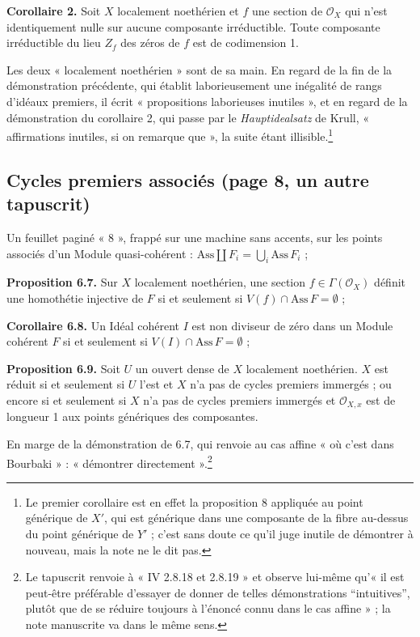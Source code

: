\documentclass[11pt,a4paper]{article}
\begin{document}
\textbf{Corollaire 2.} Soit $X$ localement noethérien et $f$ une section de
$\mathcal{O}_{X}$ qui n'est identiquement nulle sur aucune composante
irréductible. Toute composante irréductible du lieu $Z_{f}$ des zéros de $f$
est de codimension 1.

Les deux « localement noethérien » sont de sa main. En regard de la fin de la
démonstration précédente, qui établit laborieusement une inégalité de rangs
d'idéaux premiers, il écrit « propositions laborieuses inutiles », et en
regard de la démonstration du corollaire 2, qui passe par le
\emph{Hauptidealsatz} de Krull, « affirmations inutiles, si on remarque que »,
la suite étant illisible.\footnote{Le premier corollaire est en effet la
proposition 8 appliquée au point générique de $X'$, qui est générique dans une
composante de la fibre au-dessus du point générique de $Y'$ ; c'est sans doute
ce qu'il juge inutile de démontrer à nouveau, mais la note ne le dit pas.}

\subsection*{Cycles premiers associés (page 8, un autre tapuscrit)}

Un feuillet paginé « 8 », frappé sur une machine sans accents, sur les points
associés d'un Module quasi-cohérent : $\mathrm{Ass} \coprod F_{i} = \bigcup_{i}
\mathrm{Ass}\, F_{i}$ ;

\textbf{Proposition 6.7.} Sur $X$ localement noethérien, une section
$f \in \Gamma(\mathcal{O}_{X})$ définit une homothétie injective de $F$ si et
seulement si $V(f) \cap \mathrm{Ass}\, F = \emptyset$ ;

\textbf{Corollaire 6.8.} Un Idéal cohérent $I$ est non diviseur de zéro dans un
Module cohérent $F$ si et seulement si $V(I) \cap \mathrm{Ass}\, F = \emptyset$ ;

\textbf{Proposition 6.9.} Soit $U$ un ouvert dense de $X$ localement
noethérien. $X$ est réduit si et seulement si $U$ l'est et $X$ n'a pas de
cycles premiers immergés ; ou encore si et seulement si $X$ n'a pas de cycles
premiers immergés et $\mathcal{O}_{X,x}$ est de longueur 1 aux points
génériques des composantes.

En marge de la démonstration de 6.7, qui renvoie au cas affine « où c'est dans
Bourbaki » : « démontrer directement ».\footnote{Le tapuscrit renvoie à
« IV 2.8.18 et 2.8.19 » et observe lui-même qu'« il est peut-être préférable
d'essayer de donner de telles démonstrations “intuitives”, plutôt que de se
réduire toujours à l'énoncé connu dans le cas affine » ; la note manuscrite va
dans le même sens.}
\end{document}
